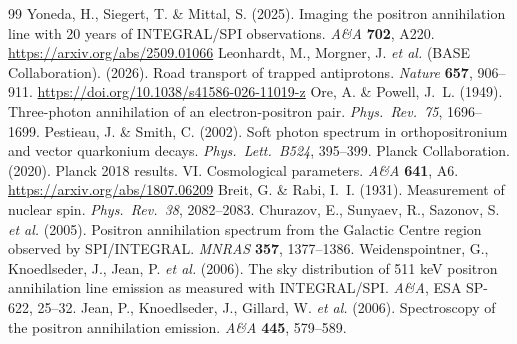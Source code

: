 \documentclass[12pt,a4paper]{article}
\begin{document}
\begin{thebibliography}{99}
     Yoneda, H., Siegert, T. \& Mittal, S. (2025). Imaging the positron annihilation line with 20 years of INTEGRAL/SPI observations. \textit{A\&A} \textbf{702}, A220. \url{https://arxiv.org/abs/2509.01066}
     Leonhardt, M., Morgner, J. \textit{et al.} (BASE Collaboration). (2026). Road transport of trapped antiprotons. \textit{Nature} \textbf{657}, 906--911. \url{https://doi.org/10.1038/s41586-026-11019-z}
     Ore, A. \& Powell, J.~L. (1949). Three-photon annihilation of an electron-positron pair. \textit{Phys.\ Rev.\ 75}, 1696--1699.
     Pestieau, J. \& Smith, C. (2002). Soft photon spectrum in orthopositronium and vector quarkonium decays. \textit{Phys.\ Lett.\ B524}, 395--399.
     Planck Collaboration. (2020). Planck 2018 results. VI. Cosmological parameters. \textit{A\&A} \textbf{641}, A6. \url{https://arxiv.org/abs/1807.06209}
     Breit, G. \& Rabi, I.~I. (1931). Measurement of nuclear spin. \textit{Phys.\ Rev.\ 38}, 2082--2083.
     Churazov, E., Sunyaev, R., Sazonov, S. \textit{et al.} (2005). Positron annihilation spectrum from the Galactic Centre region observed by SPI/INTEGRAL. \textit{MNRAS} \textbf{357}, 1377--1386.
     Weidenspointner, G., Knoedlseder, J., Jean, P. \textit{et al.} (2006). The sky distribution of 511 keV positron annihilation line emission as measured with INTEGRAL/SPI. \textit{A\&A}, ESA SP-622, 25--32.
     Jean, P., Knoedlseder, J., Gillard, W. \textit{et al.} (2006). Spectroscopy of the positron annihilation emission. \textit{A\&A} \textbf{445}, 579--589.
\end{thebibliography}
\end{document}
